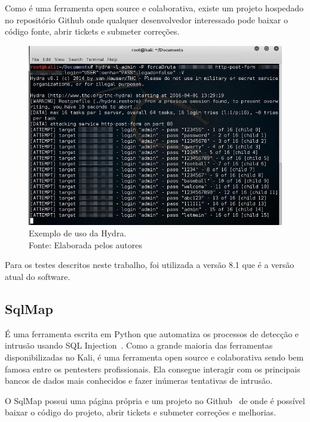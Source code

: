 \documentclass[
    12pt,               %
    openright,          %
    oneside,            %
    a4paper,            %
    section=TITLE,     %
    english,            %
    french,             %
    spanish,            %
    brazil              %
    ]{abntex2}
\newcommand{\citep}{\cite}
\begin{document}
Como é uma ferramenta open source e colaborativa, existe um projeto hospedado no repositório Github onde qualquer desenvolvedor interessado pode baixar o código fonte, abrir tickets e submeter correções.\citep{62221}





\begin{figure}[htp]
\centering
\caption{Exemplo de uso da Hydra. \\Fonte: Elaborada pelos autores}
\includegraphics[width=450px]{image1.jpeg}
\end{figure}
\ifdefined\FloatBarrier \FloatBarrier \fi


Para os testes descritos neste trabalho, foi utilizada a versão 8.1 que é a versão atual do software.



\subsection*{SqlMap}

É uma ferramenta escrita em Python que automatiza os processos de detecção e intrusão usando SQL Injection~. Como a grande maioria das ferramentas disponibilizadas no Kali, é uma ferramenta open source e colaborativa sendo bem famosa entre os pentesters profissionais. Ela consegue interagir com os principais bancos de dados mais conhecidos e fazer inúmeras tentativas de intrusão.


O SqlMap possui uma página própria e um projeto no Github \citep{62222}~de onde é possível baixar o código do projeto, abrir tickets e submeter correções e melhorias.
\end{document}

